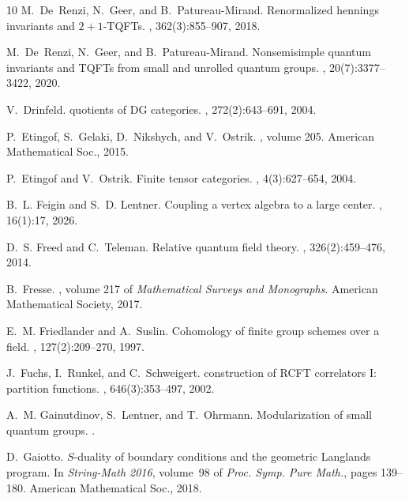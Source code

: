 \documentclass[reqno]{amsart}
\theoremstyle{definition}
\renewcommand{\1}{\mathbf{1}}
\begin{document}
\begin{thebibliography}{10}
M.~De~Renzi, N.~Geer, and B.~Patureau-Mirand.
\newblock Renormalized hennings invariants and $2+1$-{TQFT}s.
, 362(3):855--907, 2018.

M.~De~Renzi, N.~Geer, and B.~Patureau-Mirand.
\newblock Nonsemisimple quantum invariants and {TQFT}s from small and unrolled
  quantum groups.
, 20(7):3377--3422, 2020.

V.~Drinfeld.
 quotients of {DG} categories.
, 272(2):643--691, 2004.

P.~Etingof, S.~Gelaki, D.~Nikshych, and V.~Ostrik.
, volume 205.
\newblock American Mathematical Soc., 2015.

P.~Etingof and V.~Ostrik.
\newblock Finite tensor categories.
, 4(3):627--654, 2004.

B.~L. Feigin and S.~D. Lentner.
\newblock Coupling a vertex algebra to a large center.
, 16(1):17, 2026.

D.~S. Freed and C.~Teleman.
\newblock Relative quantum field theory.
, 326(2):459--476, 2014.

B.~Fresse.
, volume 217 of {\em Mathematical Surveys and Monographs}.
\newblock American Mathematical Society, 2017.

E.~M. Friedlander and A.~Suslin.
\newblock Cohomology of finite group schemes over a field.
, 127(2):209--270, 1997.

J.~Fuchs, I.~Runkel, and C.~Schweigert.
 construction of {RCFT} correlators {I}: partition functions.
, 646(3):353--497, 2002.

A.~M. Gainutdinov, S.~Lentner, and T.~Ohrmann.
\newblock Modularization of small quantum groups.
.

D.~Gaiotto.
\newblock ${S}$-duality of boundary conditions and the geometric {L}anglands
  program.
\newblock In {\em String-Math 2016}, volume~98 of {\em Proc. Symp. Pure Math.},
  pages 139--180. American Mathematical Soc., 2018.


\end{thebibliography}
\end{document}
